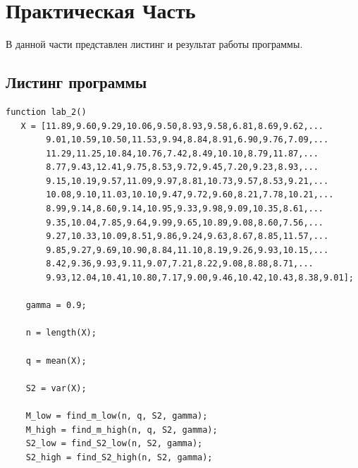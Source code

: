 \chapter{Практическая Часть}
В данной части представлен листинг и результат работы программы.
\section{Листинг программы}
\begin{lstlisting}
function lab_2()
   X = [11.89,9.60,9.29,10.06,9.50,8.93,9.58,6.81,8.69,9.62,...
        9.01,10.59,10.50,11.53,9.94,8.84,8.91,6.90,9.76,7.09,...
        11.29,11.25,10.84,10.76,7.42,8.49,10.10,8.79,11.87,...
        8.77,9.43,12.41,9.75,8.53,9.72,9.45,7.20,9.23,8.93,...
        9.15,10.19,9.57,11.09,9.97,8.81,10.73,9.57,8.53,9.21,...
        10.08,9.10,11.03,10.10,9.47,9.72,9.60,8.21,7.78,10.21,...
        8.99,9.14,8.60,9.14,10.95,9.33,9.98,9.09,10.35,8.61,...
        9.35,10.04,7.85,9.64,9.99,9.65,10.89,9.08,8.60,7.56,...
        9.27,10.33,10.09,8.51,9.86,9.24,9.63,8.67,8.85,11.57,...
        9.85,9.27,9.69,10.90,8.84,11.10,8.19,9.26,9.93,10.15,...
        8.42,9.36,9.93,9.11,9.07,7.21,8.22,9.08,8.88,8.71,...
        9.93,12.04,10.41,10.80,7.17,9.00,9.46,10.42,10.43,8.38,9.01];

    gamma = 0.9;

    n = length(X);

    q = mean(X);

    S2 = var(X);

    M_low = find_m_low(n, q, S2, gamma);
    M_high = find_m_high(n, q, S2, gamma);
    S2_low = find_S2_low(n, S2, gamma);
    S2_high = find_S2_high(n, S2, gamma);
\end{lstlisting}

